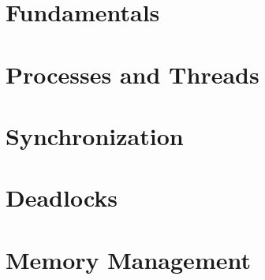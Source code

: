 \documentclass[a4paper,11pt]{book}
\begin{document}
\frontmatter



\tableofcontents
\listoffigures
\listoftables

\mainmatter

\part{Fundamentals}




\part{Processes and Threads}





\part{Synchronization}





\part{Deadlocks}




\part{Memory Management}







\end{document}
